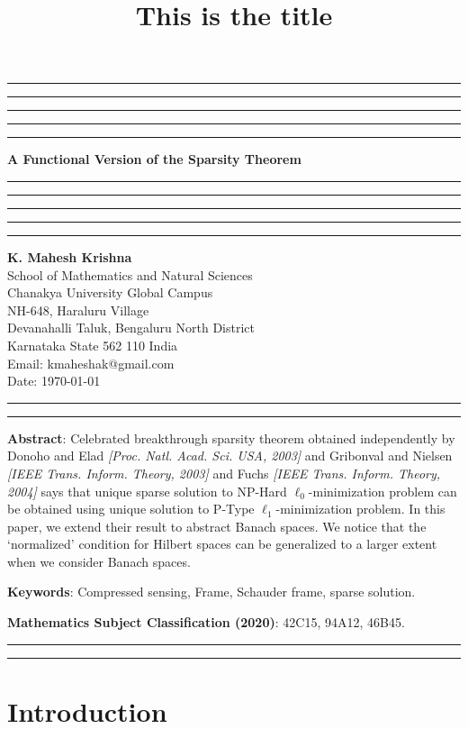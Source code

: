 \documentclass{amsart}
\title{This is the title}
\begin{document}
\hrule\hrule\hrule\hrule\hrule
\vspace{0.3cm}	
\begin{center}
{\bf{A Functional Version of the Sparsity Theorem}}\\
\vspace{0.3cm}
\hrule\hrule\hrule\hrule\hrule
\vspace{0.3cm}
\textbf{K. Mahesh Krishna}\\
School of Mathematics and Natural Sciences\\
Chanakya University Global Campus\\
NH-648, Haraluru Village\\
Devanahalli Taluk, 	Bengaluru  North District\\
Karnataka State 562 110 India\\
Email: kmaheshak@gmail.com\\

Date: \today
\end{center}

\hrule\hrule
\vspace{0.5cm}
\textbf{Abstract}: Celebrated breakthrough sparsity theorem obtained independently by Donoho and Elad \textit{[Proc. Natl. Acad. Sci. USA, 2003]} and Gribonval and Nielsen \textit{[IEEE Trans. Inform. Theory, 2003]} and Fuchs \textit{[IEEE Trans. Inform. Theory, 2004]} says that unique  sparse solution to NP-Hard $\ell_0$-minimization problem can be obtained using unique solution to P-Type $\ell_1$-minimization problem. In this paper, we extend their result to abstract Banach spaces.  We notice that the `normalized' condition for Hilbert spaces can be generalized to a larger extent when we consider Banach spaces.



\textbf{Keywords}:   Compressed sensing, Frame, Schauder frame, sparse solution.

\textbf{Mathematics Subject Classification (2020)}: 42C15, 94A12, 46B45.\\

\hrule


\hrule
\section{Introduction}
\end{document}
